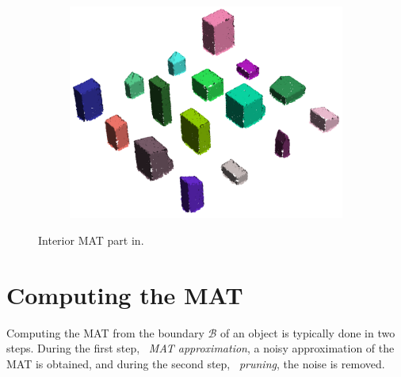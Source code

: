 \begin{figure}
\begin{subfigure}[t]{0.45\linewidth}
		\includegraphics[width=\linewidth]{figs/smat/smat_r3d_surface_int.png}
		\label{fig:smat_r3d_surface_int}
	\end{subfigure}
	\caption{Interior MAT part in.}
	\label{fig:smat_r3d_int}
\end{figure}


\section{Computing the MAT} 
Computing the MAT from the boundary $\mathcal{B}$ of an object is typically done in two steps. 
During the first step, \ie\ \emph{MAT approximation}, a noisy approximation of the MAT is obtained, and during the second step, \ie\ \emph{pruning}, the noise is removed.

